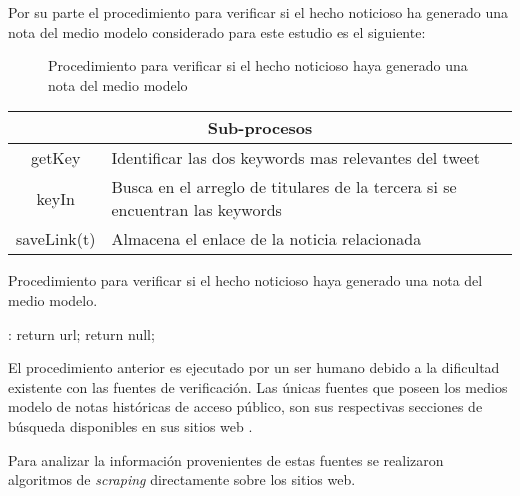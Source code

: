 Por su parte el procedimiento para verificar si el hecho noticioso ha generado una nota del medio modelo considerado para este estudio es el siguiente:

\begin{figure}[H]
\begin{center}
	\caption{Procedimiento para verificar si el hecho noticioso haya generado una nota del medio modelo}
	\label{fig:haveLink}
\end{center}
\end{figure}

\begin{center}
	\begin{tabular}{|c|l|}
		\multicolumn{2}{c}{\textbf{Sub-procesos}} \\ \hline
		getKey & Identificar las dos keywords mas relevantes del tweet\\ \hline
		keyIn  & Busca en el arreglo de titulares de la tercera si se encuentran las keywords \\              \hline
		saveLink(t) & Almacena el enlace de la noticia relacionada \\ \hline
	\end{tabular}
\end{center}

\begin{algorithm}[H]
	\caption{Procedimiento para verificar si el hecho noticioso haya generado una nota del medio modelo.}
	\label{pchaveLink}
	\begin{algorithmic}[1]
		:
			\State return url;
		\Else
			\State return null;
		\EndIf
		\EndFunction
	\end{algorithmic}
\end{algorithm}	

El procedimiento anterior es ejecutado por un ser humano debido a la dificultad existente con las fuentes de verificación. Las únicas fuentes que poseen los medios modelo de notas históricas de acceso público, son sus respectivas secciones de búsqueda disponibles en sus sitios web \cite{busqueda24horas} \cite{busquedaBioBio} \cite{busquedaLaTercera}.

Para analizar la información provenientes de estas fuentes se realizaron algoritmos de \emph{scraping} directamente sobre los sitios web.